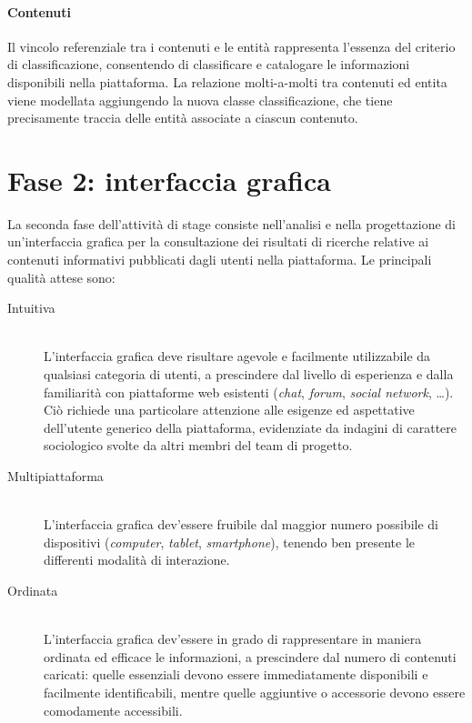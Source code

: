 \paragraph{Contenuti}
Il vincolo referenziale tra i contenuti e le entità rappresenta l'essenza del criterio di classificazione, consentendo di classificare e catalogare le informazioni disponibili nella piattaforma. La relazione molti-a-molti tra \textsf{contenuti} ed \textsf{entita} viene modellata aggiungendo la nuova classe \textsf{classificazione}, che tiene precisamente traccia delle entità associate a ciascun contenuto.

\section{Fase 2: interfaccia grafica}
\label{sec:tesi:stage:fase-2}

La seconda fase dell'attività di stage consiste nell'analisi e nella progettazione di un'interfaccia grafica per la consultazione dei risultati di ricerche relative ai contenuti informativi pubblicati dagli utenti nella piattaforma. Le principali qualità attese sono:
\begin{description}
	\item[Intuitiva] \hfill \\
	L'interfaccia grafica deve risultare agevole e facilmente utilizzabile da qualsiasi categoria di utenti, a prescindere dal livello di esperienza e dalla familiarità con piattaforme web esistenti (\textit{chat}, \textit{forum}, \textit{social network}, \ldots). Ciò richiede una particolare attenzione alle esigenze ed aspettative dell'utente generico della piattaforma, evidenziate da indagini di carattere sociologico svolte da altri membri del team di progetto.
	\item[Multipiattaforma] \hfill \\
	L'interfaccia grafica dev'essere fruibile dal maggior numero possibile di dispositivi (\textit{computer}, \textit{tablet}, \textit{smartphone}), tenendo ben presente le differenti modalità di interazione.
	\item[Ordinata] \hfill \\
	L'interfaccia grafica dev'essere in grado di rappresentare in maniera ordinata ed efficace le informazioni, a prescindere dal numero di contenuti caricati: quelle essenziali devono essere immediatamente disponibili e facilmente identificabili, mentre quelle aggiuntive o accessorie devono essere comodamente accessibili.
\end{description}

